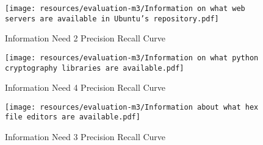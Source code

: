 



\begin{figure}
    \centering
    \texttt{[image: resources/evaluation-m3/Information on what web servers are available in Ubuntu's repository.pdf]}
    \caption{Information Need 2 Precision Recall Curve}
    \label{fig:info-need-2-prcurve2}
\end{figure}

\begin{figure}
    \centering
    \texttt{[image: resources/evaluation-m3/Information on what python cryptography libraries are available.pdf]}
    \caption{Information Need 4 Precision Recall Curve}
    \label{fig:info-need-4-prcurve2}
\end{figure}

\begin{figure}
    \centering
    \texttt{[image: resources/evaluation-m3/Information about what hex file editors are available.pdf]}
    \caption{Information Need 3 Precision Recall Curve}
    \label{fig:info-need-3-prcurve2}
\end{figure}